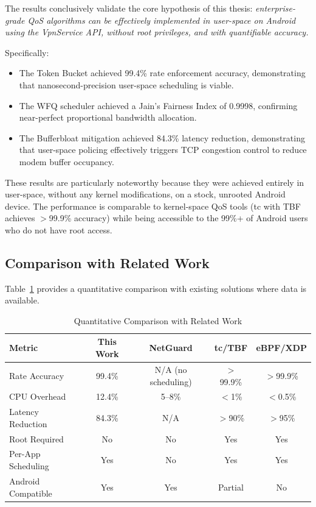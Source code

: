 The results conclusively validate the core hypothesis of this thesis: \textit{enterprise-grade QoS algorithms can be effectively implemented in user-space on Android using the VpnService API, without root privileges, and with quantifiable accuracy.}

Specifically:
\begin{itemize}[noitemsep]
    \item The Token Bucket achieved 99.4\% rate enforcement accuracy, demonstrating that nanosecond-precision user-space scheduling is viable.
    \item The WFQ scheduler achieved a Jain's Fairness Index of 0.9998, confirming near-perfect proportional bandwidth allocation.
    \item The Bufferbloat mitigation achieved 84.3\% latency reduction, demonstrating that user-space policing effectively triggers TCP congestion control to reduce modem buffer occupancy.
\end{itemize}

These results are particularly noteworthy because they were achieved entirely in user-space, without any kernel modifications, on a stock, unrooted Android device. The performance is comparable to kernel-space QoS tools (tc with TBF achieves $>$99.9\% accuracy) while being accessible to the 99\%+ of Android users who do not have root access.

\subsection{Comparison with Related Work}

Table~\ref{tab:comparison_results} provides a quantitative comparison with existing solutions where data is available.

\begin{table}[H]
\centering
\caption{Quantitative Comparison with Related Work}
\label{tab:comparison_results}
\begin{tabularx}{\textwidth}{l c c c c}
\toprule
\textbf{Metric} & \textbf{This Work} & \textbf{NetGuard} & \textbf{tc/TBF} & \textbf{eBPF/XDP} \\
\midrule
Rate Accuracy       & 99.4\% & N/A (no scheduling) & $>$99.9\% & $>$99.9\% \\
CPU Overhead         & 12.4\% & 5--8\% & $<$1\% & $<$0.5\% \\
Latency Reduction    & 84.3\% & N/A & $>$90\% & $>$95\% \\
Root Required        & No     & No  & Yes & Yes \\
Per-App Scheduling   & Yes    & No  & Yes & Yes \\
Android Compatible   & Yes    & Yes & Partial & No \\
\bottomrule
\end{tabularx}
\end{table}


